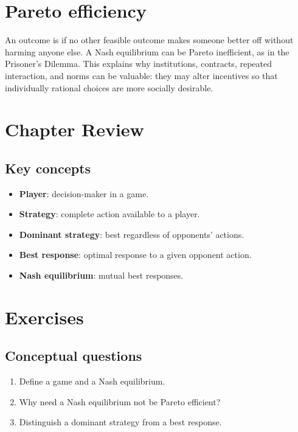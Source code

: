 \section{Pareto efficiency}

An outcome is  if no other feasible outcome makes someone better off without harming anyone else. A Nash equilibrium can be Pareto inefficient, as in the Prisoner's Dilemma. This explains why institutions, contracts, repeated interaction, and norms can be valuable: they may alter incentives so that individually rational choices are more socially desirable.

\section*{Chapter Review}

\subsection*{Key concepts}
\begin{itemize}
  \item \textbf{Player}: decision-maker in a game.
  \item \textbf{Strategy}: complete action available to a player.
  \item \textbf{Dominant strategy}: best regardless of opponents' actions.
  \item \textbf{Best response}: optimal response to a given opponent action.
  \item \textbf{Nash equilibrium}: mutual best responses.
\end{itemize}

\section*{Exercises}

\subsection*{Conceptual questions}
\begin{enumerate}[label=\arabic*.]
  \item Define a game and a Nash equilibrium.
  \item Why need a Nash equilibrium not be Pareto efficient?
  \item Distinguish a dominant strategy from a best response.
\end{enumerate}

